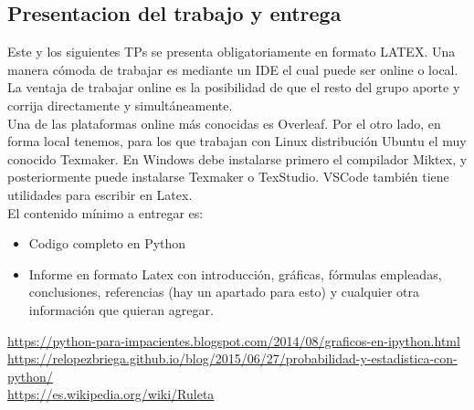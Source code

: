 \documentclass[onecolumn]{article}
\begin{document}
\subsection{Presentacion del trabajo y entrega}
\normalsize Este y los siguientes TPs se presenta obligatoriamente en formato LATEX. Una manera cómoda de trabajar es mediante un IDE el cual puede ser online o local. La ventaja de trabajar online es la posibilidad de que el resto del grupo aporte y corrija directamente y simultáneamente.\\[2ex]
\normalsize Una de las plataformas online más conocidas es Overleaf. Por el otro lado, en forma local tenemos, para los que trabajan con Linux distribución Ubuntu el muy conocido Texmaker. En Windows debe instalarse primero el compilador Miktex, y posteriormente puede instalarse Texmaker o TexStudio. VSCode también tiene utilidades para escribir en Latex.\\[2ex]
\normalsize El contenido mínimo a entregar es:\\[2ex]
\begin{itemize}
  \item Codigo completo en Python
  \item Informe en formato Latex con introducción, gráficas, fórmulas empleadas, conclusiones, referencias (hay un apartado para esto) y cualquier otra información que quieran agregar.
  \end{itemize}



\begin{thebibliography}{99} %

\normalsize \href{https://python-para-impacientes.blogspot.com/2014/08/graficos-en-ipython.html}{https://python-para-impacientes.blogspot.com/2014/08/graficos-en-ipython.html}\\
\normalsize \href{https://relopezbriega.github.io/blog/2015/06/27/probabilidad-y-estadistica-con-python/}{https://relopezbriega.github.io/blog/2015/06/27/probabilidad-y-estadistica-con-python/} \\
\normalsize \href{https://es.wikipedia.org/wiki/Ruleta}{https://es.wikipedia.org/wiki/Ruleta} \\
 
\end{thebibliography}

\end{document}
